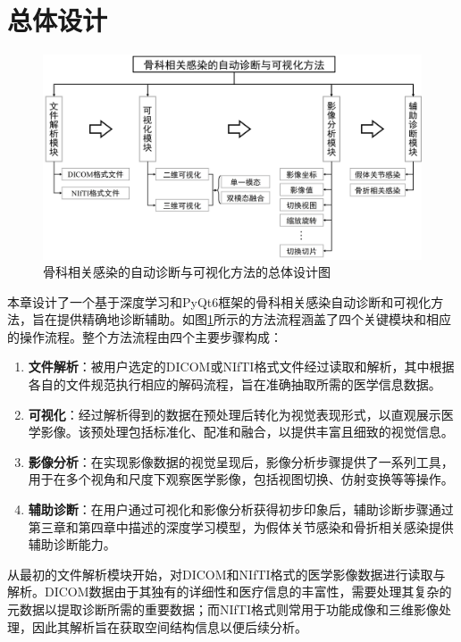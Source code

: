 \section{总体设计}

\begin{figure}[h]
  \centering
  \includegraphics[width=\textwidth]{figures/chap05_overall.jpg}
  \caption{骨科相关感染的自动诊断与可视化方法的总体设计图}
  \label{fig:chap05_overall}
\end{figure}

本章设计了一个基于深度学习和PyQt6框架的骨科相关感染自动诊断和可视化方法，旨在提供精确地诊断辅助。如图\ref{fig:chap05_overall}所示的方法流程涵盖了四个关键模块和相应的操作流程。整个方法流程由四个主要步骤构成：
\begin{enumerate}
  \item \textbf{文件解析}：被用户选定的DICOM或NIfTI格式文件经过读取和解析，其中根据各自的文件规范执行相应的解码流程，旨在准确抽取所需的医学信息数据。
  \item \textbf{可视化}：经过解析得到的数据在预处理后转化为视觉表现形式，以直观展示医学影像。该预处理包括标准化、配准和融合，以提供丰富且细致的视觉信息。
  \item \textbf{影像分析}：在实现影像数据的视觉呈现后，影像分析步骤提供了一系列工具，用于在多个视角和尺度下观察医学影像，包括视图切换、仿射变换等等操作。
  \item \textbf{辅助诊断}：在用户通过可视化和影像分析获得初步印象后，辅助诊断步骤通过第三章和第四章中描述的深度学习模型，为假体关节感染和骨折相关感染提供辅助诊断能力。
\end{enumerate}

从最初的文件解析模块开始，对DICOM和NIfTI格式的医学影像数据进行读取与解析。DICOM数据由于其独有的详细性和医疗信息的丰富性，需要处理其复杂的元数据以提取诊断所需的重要数据；而NIfTI格式则常用于功能成像和三维影像处理，因此其解析旨在获取空间结构信息以便后续分析。


